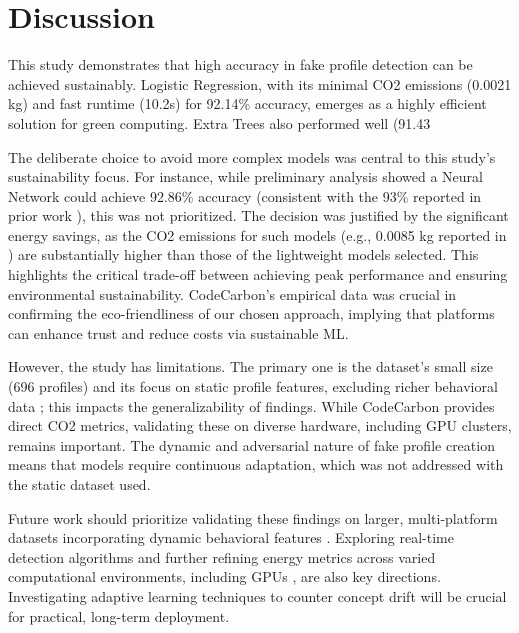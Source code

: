 \documentclass[conference]{IEEEtran}
\begin{document}
\section{Discussion}
\label{sec:discuss}
This study demonstrates that high accuracy in fake profile detection can be achieved sustainably. Logistic Regression, with its minimal CO2 emissions (0.0021 kg) and fast runtime (10.2s) for 92.14\% accuracy, emerges as a highly efficient solution for green computing. Extra Trees also performed well (91.43%

The deliberate choice to avoid more complex models was central to this study's sustainability focus. For instance, while preliminary analysis showed a Neural Network could achieve 92.86\% accuracy (consistent with the 93\% reported in prior work \cite{b6}), this was not prioritized. The decision was justified by the significant energy savings, as the CO2 emissions for such models (e.g., 0.0085 kg reported in \cite{b6}) are substantially higher than those of the lightweight models selected. This highlights the critical trade-off between achieving peak performance and ensuring environmental sustainability. CodeCarbon's empirical data was crucial in confirming the eco-friendliness of our chosen approach, implying that platforms can enhance trust and reduce costs via sustainable ML.

However, the study has limitations. The primary one is the dataset's small size (696 profiles) and its focus on static profile features, excluding richer behavioral data \cite{b12}; this impacts the generalizability of findings. While CodeCarbon provides direct CO2 metrics, validating these on diverse hardware, including GPU clusters, remains important. The dynamic and adversarial nature of fake profile creation means that models require continuous adaptation, which was not addressed with the static dataset used.

Future work should prioritize validating these findings on larger, multi-platform datasets incorporating dynamic behavioral features \cite{b12}. Exploring real-time detection algorithms \cite{b14} and further refining energy metrics across varied computational environments, including GPUs \cite{b13}, are also key directions. Investigating adaptive learning techniques to counter concept drift will be crucial for practical, long-term deployment.
\end{document}
